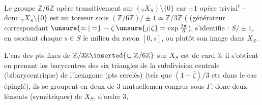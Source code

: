 
Le groupe $\mathbb Z/6\mathbb Z$ opère transitivement sur
$({}_2X_S)\setminus\{0\}$ \unsure{(}car $\pm1$ opère trivial\textsuperscript{t} - donc
${}_2X_S\setminus\{0\}$ est un torseur sous
$(\mathbb Z/6\mathbb Z)/\pm1\simeq\mathbb Z/3\mathbb Z$
( (générateur correspondant
$\unsure{\simeq|=}\,-\bar\zeta\,\unsure{j|\zeta}=\exp\frac{2\pi}{6}$),
 
s'identifie : $S/\pm1$, en ssociant
 chaque $s\in S$ le milieu du rayon
$[0,s]$, ou plutôt son image dans \unsure{\inserted{)}} $X_S$.

L'ens des pts fixes de $\mathbb Z/3\mathbb Z\inserted{\subset\mathbb Z/6\mathbb Z}$ sur $X_S$
est de card 3, il s'obtient en prenant
les barycentres des six triangles
de la subdivision centrale (bibarycentrique)
de l'hexagone (pts cerclés) (tels que
$(1-\bar\zeta)/3$ etc dans le cas \unsure{:} épinglé), ils
se groupent en deux  de 3
mutuellemen congrus sous $\Gamma$, donc 
deux léments (symétriques) de $X_S$, d'ordre 3,

